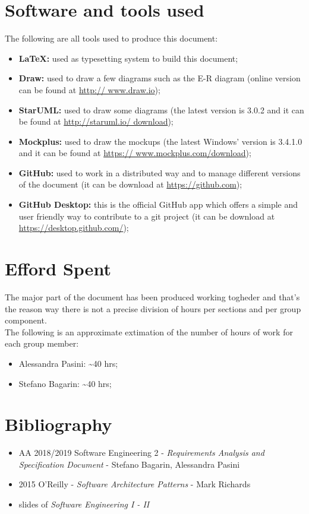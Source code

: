 \section{Software and tools used}
The following are all tools used to produce this document:
\begin{itemize}
	\item \textbf{\LaTeX:} used as typesetting system to build this document;
	\item \textbf{Draw:} used to draw a few diagrams such as the E-R diagram (online version can be found at \url{http://				www.draw.io});
	\item \textbf{StarUML:} used to draw some diagrams (the latest version is 3.0.2 and it can be found at \url{http://staruml.io/			download});
	\item \textbf{Mockplus:} used to draw the mockups (the latest Windows' version is 3.4.1.0 and it can be found at \url{https://			www.mockplus.com/download});
	\item \textbf{GitHub:} used to work in a distributed way and to manage different versions of the document (it can be download at		\url{https://github.com});
	\item \textbf{GitHub Desktop:} this is the official GitHub app which offers a simple and user friendly way to contribute to a git 			project (it can be download at \url{https://desktop.github.com/});
\end{itemize}

\section{Efford Spent}
The major part of the document has been produced working togheder and that's the reason way there is not a precise division of hours per sections and per group component.\\
The following is an approximate extimation of the number of hours of work for each group member:
\begin{itemize}
\item Alessandra Pasini: \textasciitilde 40 hrs;
\item Stefano Bagarin: \textasciitilde 40 hrs;
\end{itemize}

\section{Bibliography}
\begin{itemize}
	\item AA 2018/2019 Software Engineering 2 - \emph{Requirements Analysis and Specification Document} - Stefano Bagarin, 			Alessandra Pasini
	\item 2015 O'Reilly -  \emph{Software Architecture Patterns} - Mark Richards
	\item slides of \emph{Software Engineering I - II}
\end{itemize}
